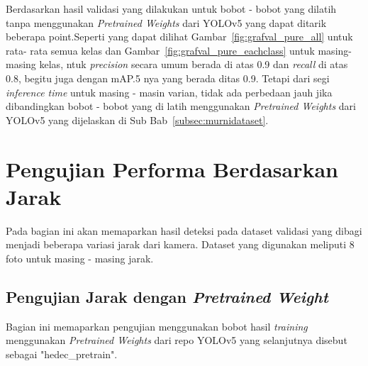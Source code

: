 \par Berdasarkan hasil validasi yang dilakukan untuk bobot - bobot yang dilatih tanpa menggunakan \emph{Pretrained Weights} dari YOLOv5
yang dapat ditarik beberapa point.Seperti yang dapat dilihat Gambar~\ref{fig:grafval_pure_all} untuk rata- rata semua kelas
dan Gambar~\ref{fig:grafval_pure_eachclass} untuk masing-masing kelas, ntuk \emph{precision} secara umum berada di atas 0.9 dan \emph{recall} di atas 0.8, begitu juga dengan
mAP.5 nya yang berada ditas 0.9. Tetapi dari segi \emph{inference time} untuk masing - masin varian, tidak ada perbedaan jauh jika dibandingkan
bobot - bobot yang di latih menggunakan \emph{Pretrained Weights} dari YOLOv5 yang dijelaskan di Sub Bab~\ref{subsec:murnidataset}.

\section{Pengujian Performa Berdasarkan Jarak}
\label{sec:ujiberdasarkanjarak}

Pada bagian ini akan memaparkan hasil deteksi pada dataset validasi yang dibagi menjadi beberapa variasi jarak dari kamera. Dataset yang digunakan meliputi 8 foto untuk masing - masing jarak.

\subsection{Pengujian Jarak dengan \emph{Pretrained Weight}}
\label{subsec:ujijarak_pretrainedweight}

\par Bagian ini memaparkan pengujian menggunakan bobot hasil \emph{training} menggunakan \emph{Pretrained Weights}
dari repo YOLOv5 yang selanjutnya disebut sebagai "hedec\_pretrain". 

